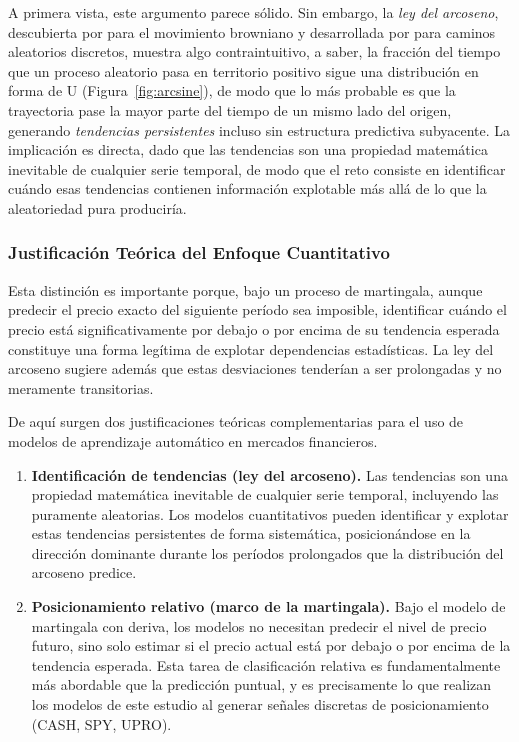 ﻿\documentclass[11pt,a4paper]{article}
\begin{document}
A primera vista, este argumento parece s\'olido. Sin embargo, la \textit{ley del arcoseno}, descubierta por \citet{levy1939} para el movimiento browniano y desarrollada por \citet{feller1968} para caminos aleatorios discretos, muestra algo contraintuitivo, a saber, la fracci\'on del tiempo que un proceso aleatorio pasa en territorio positivo sigue una distribuci\'on en forma de U (Figura~\ref{fig:arcsine}), de modo que lo m\'as probable es que la trayectoria pase la mayor parte del tiempo de un mismo lado del origen, generando \textit{tendencias persistentes} incluso sin estructura predictiva subyacente. La implicaci\'on es directa, dado que las tendencias son una propiedad matem\'atica inevitable de cualquier serie temporal, de modo que el reto consiste en identificar cu\'ando esas tendencias contienen informaci\'on explotable m\'as all\'a de lo que la aleatoriedad pura producir\'ia.

\subsubsection{Justificaci\'on Te\'orica del Enfoque Cuantitativo}

Esta distinci\'on es importante porque, bajo un proceso de martingala, aunque predecir el precio exacto del siguiente per\'iodo sea imposible, identificar cu\'ando el precio est\'a significativamente por debajo o por encima de su tendencia esperada constituye una forma leg\'itima de explotar dependencias estad\'isticas. La ley del arcoseno sugiere adem\'as que estas desviaciones tender\'ian a ser prolongadas y no meramente transitorias.

De aqu\'i surgen dos justificaciones te\'oricas complementarias para el uso de modelos de aprendizaje autom\'atico en mercados financieros.

\begin{enumerate}
    \item \textbf{Identificaci\'on de tendencias (ley del arcoseno).} Las tendencias son una propiedad matem\'atica inevitable de cualquier serie temporal, incluyendo las puramente aleatorias. Los modelos cuantitativos pueden identificar y explotar estas tendencias persistentes de forma sistem\'atica, posicion\'andose en la direcci\'on dominante durante los per\'iodos prolongados que la distribuci\'on del arcoseno predice.

    \item \textbf{Posicionamiento relativo (marco de la martingala).} Bajo el modelo de martingala con deriva, los modelos no necesitan predecir el nivel de precio futuro, sino solo estimar si el precio actual est\'a por debajo o por encima de la tendencia esperada. Esta tarea de clasificaci\'on relativa es fundamentalmente m\'as abordable que la predicci\'on puntual, y es precisamente lo que realizan los modelos de este estudio al generar se\~nales discretas de posicionamiento (CASH, SPY, UPRO).
\end{enumerate}
\end{document}
